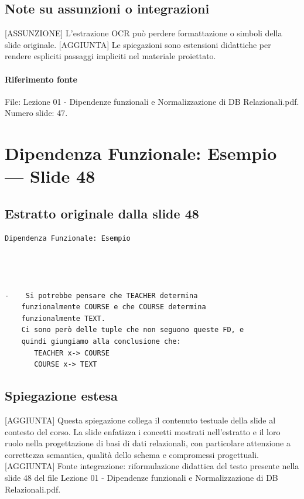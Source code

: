 \documentclass[11pt]{article}
\begin{document}
\subsection*{Note su assunzioni o integrazioni}
[ASSUNZIONE] L'estrazione OCR può perdere formattazione o simboli della slide originale.
[AGGIUNTA] Le spiegazioni sono estensioni didattiche per rendere espliciti passaggi impliciti nel materiale proiettato.
\paragraph{Riferimento fonte} File: Lezione 01 - Dipendenze funzionali e Normalizzazione di DB Relazionali.pdf. Numero slide: 47.
\section{Dipendenza Funzionale: Esempio --- Slide 48}
\subsection*{Estratto originale dalla slide 48}
\begin{lstlisting}
Dipendenza Funzionale: Esempio




-    Si potrebbe pensare che TEACHER determina
    funzionalmente COURSE e che COURSE determina
    funzionalmente TEXT.
    Ci sono però delle tuple che non seguono queste FD, e
    quindi giungiamo alla conclusione che:
       TEACHER x-> COURSE
       COURSE x-> TEXT
\end{lstlisting}
\subsection*{Spiegazione estesa}
[AGGIUNTA] Questa spiegazione collega il contenuto testuale della slide al contesto del corso. La slide enfatizza i concetti mostrati nell'estratto e il loro ruolo nella progettazione di basi di dati relazionali, con particolare attenzione a correttezza semantica, qualità dello schema e compromessi progettuali.
[AGGIUNTA] Fonte integrazione: riformulazione didattica del testo presente nella slide 48 del file Lezione 01 - Dipendenze funzionali e Normalizzazione di DB Relazionali.pdf.
\end{document}
